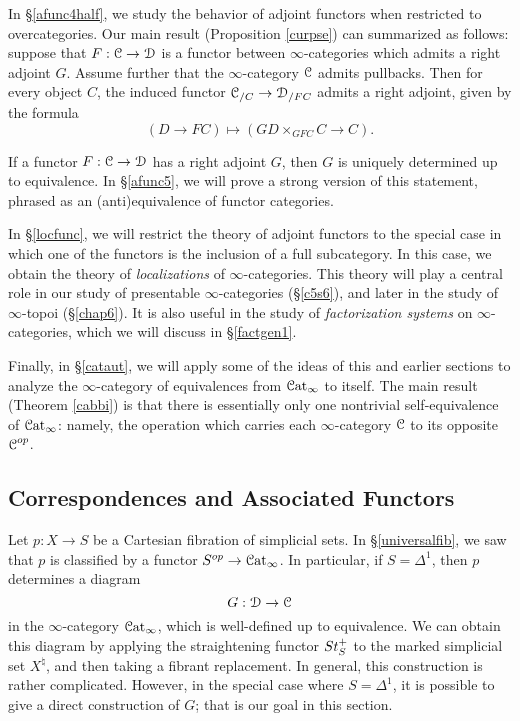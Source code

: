 In \S \ref{afunc4half}, we study the behavior of adjoint functors when restricted to overcategories.
Our main result (Proposition \ref{curpse}) can summarized as follows: suppose that
$F: \operatorname{\mathcal{C}} \rightarrow \operatorname{\mathcal{D}}$ is a functor between $\infty$-categories which admits a right adjoint
$G$. Assume further that the $\infty$-category $\operatorname{\mathcal{C}}$ admits pullbacks. Then for every object
$C$, the induced functor $\operatorname{\mathcal{C}}_{/C} \rightarrow \operatorname{\mathcal{D}}_{/FC}$ admits a right adjoint, given by
the formula 
$$(D \rightarrow FC) \mapsto (GD \times_{GFC} C \rightarrow C).$$

If a functor $F: \operatorname{\mathcal{C}} \rightarrow \operatorname{\mathcal{D}}$ has a right adjoint $G$, then $G$ is uniquely determined up to equivalence. In \S \ref{afunc5}, we will prove a strong version of this statement, phrased as an (anti)equivalence of functor categories.

In \S \ref{locfunc}, we will restrict the theory of adjoint functors to the special case in which one of the functors is the inclusion of a full subcategory. In this case, we obtain the theory of {\em localizations} of $\infty$-categories. This theory will play a central role in our study of presentable $\infty$-categories (\S \ref{c5s6}), and later in the study of $\infty$-topoi (\S \ref{chap6}). It is also useful in the study of {\it factorization systems} on $\infty$-categories, which we will discuss in
\S \ref{factgen1}.

Finally, in \S \ref{cataut}, we will apply some of the ideas of this and earlier sections to analyze the $\infty$-category of equivalences from $\operatorname{\mathcal{C}at}_{\infty}$ to itself. The main result (Theorem \ref{cabbi}) is that there is essentially only one nontrivial self-equivalence of $\operatorname{\mathcal{C}at}_{\infty}$: namely, the operation which carries each $\infty$-category $\operatorname{\mathcal{C}}$ to its opposite $\operatorname{\mathcal{C}}^{op}$.

\subsection{Correspondences and Associated Functors}\label{afunc1}

Let $p: X \rightarrow S$ be a Cartesian fibration of simplicial sets. In \S \ref{universalfib}, we
saw that $p$ is classified by a functor $S^{op} \rightarrow \operatorname{\mathcal{C}at}_{\infty}$. In particular, if
$S = \Delta^1$, then $p$ determines a diagram
$$ G: \operatorname{\mathcal{D}} \rightarrow \operatorname{\mathcal{C}}$$
in the $\infty$-category $\operatorname{\mathcal{C}at}_{\infty}$, which is well-defined up to equivalence.
We can obtain this diagram by applying the straightening
functor $St_{S}^{+}$ to the marked simplicial set $X^{\natural}$, and then taking a fibrant replacement. In general, this construction is rather complicated. However, in the special case where
$S = \Delta^1$, it is possible to give a direct construction of $G$; that is our goal in this section.

